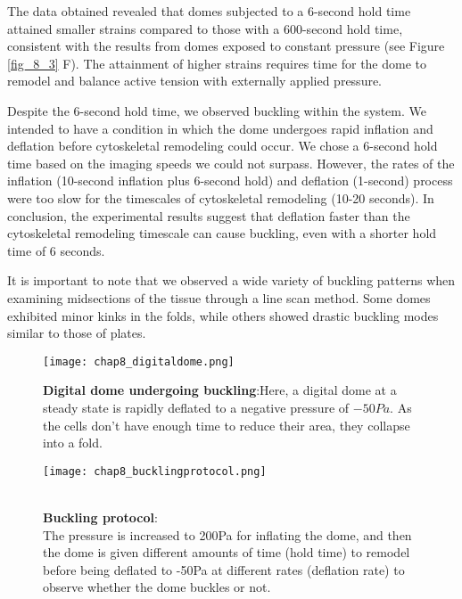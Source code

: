 The data obtained revealed that domes subjected to a 6-second hold time attained smaller strains compared to those with a 600-second hold time, consistent with the results from domes exposed to constant pressure (see Figure \ref{fig_8_3} F). The attainment of higher strains requires time for the dome to remodel and balance active tension with externally applied pressure. 

Despite the 6-second hold time, we observed buckling within the system. We intended to have a condition in which the dome undergoes rapid inflation and deflation before cytoskeletal remodeling could occur. We chose a 6-second hold time based on the imaging speeds we could not surpass. However, the rates of the inflation (10-second inflation plus 6-second hold) and deflation (1-second) process were too slow for the timescales of cytoskeletal remodeling (10-20 seconds). In conclusion, the experimental results suggest that deflation faster than the cytoskeletal remodeling timescale can cause buckling, even with a shorter hold time of 6 seconds.

It is important to note that we observed a wide variety of buckling patterns when examining midsections of the tissue through a line scan method. Some domes exhibited minor kinks in the folds, while others showed drastic buckling modes similar to those of plates.

\begin{figure}
	\centering
	\texttt{[image: chap8\_digitaldome.png]}
	\caption{\label{fig_8_1} \textbf{Digital dome undergoing buckling}:Here, a digital dome at a steady state is rapidly deflated to a negative pressure of $-50Pa$. As the cells don't have enough time to reduce their area, they collapse into a fold.
	}
\end{figure}

\begin{figure}
	\begin{minipage}[c]{0.6\textwidth}
		\texttt{[image: chap8\_bucklingprotocol.png]}
	\end{minipage}\hfill
	\begin{minipage}[c]{0.35\textwidth}
		\caption{\\ \textbf{Buckling protocol}:\\ The pressure is increased to 200Pa for inflating the dome, and then the dome is given different amounts of time (hold time) to remodel before being deflated to -50Pa at different rates (deflation rate) to observe whether the dome buckles or not.	} \label{fig_8_2}
	\end{minipage}
\end{figure}

